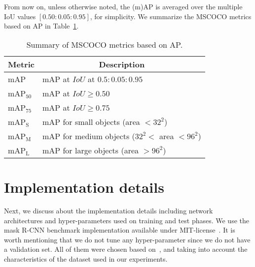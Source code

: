 From now on, unless otherwise noted, the (m)AP is averaged over the multiple IoU values $[0.50: 0.05: 0.95]$, for simplicity.
We summarize the MSCOCO metrics based on AP in Table~\ref{tab:metrics}.
%
\begin{table}[h]
\centering
\begin{tabular}{@{}ll@{}}
\toprule
\multicolumn{1}{c}{{\bf Metric}} & \multicolumn{1}{c}{{\bf Description}} \\ \midrule
mAP        & mAP at $IoU$ at $0.5:0.05:0.95$\\
mAP$_{50}$ & mAP at $IoU \geq 0.50$\\
mAP$_{75}$ & mAP at $IoU \geq 0.75$\\
\midrule
mAP$_{\textrm{S}}$           & mAP for small objects (area $ < 32^2$)\\
mAP$_{\textrm{M}}$           & mAP for medium objects ($32^2 <$ area $< 96^2$)\\
mAP$_{\textrm{L}}$           & mAP for large objects (area $ > 96^2$)\\
\bottomrule
\end{tabular}
\caption{Summary of MSCOCO metrics based on AP.}
\label{tab:metrics}
\end{table}

%
\section{Implementation details}
%
Next, we discuss about the implementation details including network architectures and hyper-parameters used on training and test phases.
We use the mask R-CNN benchmark implementation available under MIT-license~\cite{massa2018mrcnn}.
It is worth mentioning that we do not tune any hyper-parameter since we do not have a validation set.
All of them were chosen based on~\cite{He2017mask}, and taking into account the characteristics of the dataset used in our experiments.

